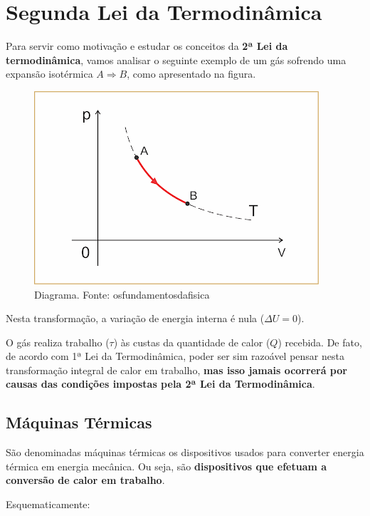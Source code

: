 \documentclass[12pt]{article}
\begin{document}
\hypertarget{x-segunda-lei-da-termodinâmica}{\section{Segunda Lei da Termodinâmica}}
Para servir como motivação e estudar os conceitos da \textbf{2ª Lei da termodinâmica}, vamos analisar o seguinte exemplo de um gás sofrendo uma expansão isotérmica $A \Rightarrow B$, como apresentado na figura.


\begin{figure}[h]{}
\centering\includegraphics[width=2.5truein]{img13.png}
\caption{Diagrama. Fonte: osfundamentosdafisica}
\centering
\end{figure}

Nesta transformação, a variação de energia interna é nula ($\Delta U=0$).


O gás realiza trabalho ($\tau$) às custas da quantidade de calor ($Q$) recebida. De fato, de acordo com 1ª Lei da Termodinâmica, poder ser sim razoável pensar nesta transformação integral de calor em trabalho, \textbf{mas isso jamais ocorrerá por causas das condições impostas pela 2ª Lei da Termodinâmica}.


\hypertarget{x-máquinas-térmicas}{\subsection{Máquinas Térmicas}}
São denominadas máquinas térmicas os dispositivos usados para converter energia térmica em energia mecânica. Ou seja,
são \textbf{dispositivos que efetuam a conversão de calor em trabalho}.


Esquematicamente:
\end{document}
